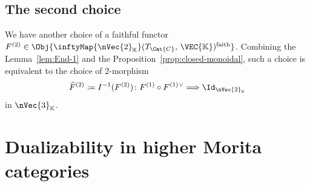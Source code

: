 \documentclass[TQFT_main]{subfiles}
\begin{document}
\subsection{The second choice}

We have another choice of a faithful functor $F^{(2)} \in \Obj{\inftyMap{\nVec{2}_{\mathbb{K}}} (T_{\Cat{C}},\, \VEC{\mathbb{K}})^{\text{faith}}}$.
Combining the Lemma~\ref{lem:End-1} and the Proposition~\ref{prop:closed-monoidal}, such a choice is equivalent to the choice of 2-morphism
\begin{align}
    \widehat{F}^{(2)} \coloneqq I^{-1} (F^{(2)}) \colon F^{(1)} \circ F^{(1)}{}^{\vee} \Longrightarrow \Id_{\nVec{2}_{\mathbb{K}}}
\end{align}
in $\nVec{3}_{\mathbb{K}}$.

\section{Dualizability in higher Morita categories}





\end{document}
